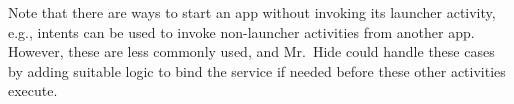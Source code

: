 \documentclass[preprint]{sig-alternate-10pt}
\newcommand{\code}[1]{\textsf{#1}}
\newcommand{\lib}{Mr.\ Hide\xspace}
\newcommand{\comment}[3][\color{red}]{}%
\newcommand{\jeff}[1]{\comment[\color{green}]{JSF}{#1}}
\newcommand{\jsjeon}[1]{\comment[\color{red}]{JJ}{#1}}
\newcommand{\kris}[1]{\comment[\color{orange}]{KM}{#1}}
\begin{document}
Note that there are ways to start an app without invoking its launcher
activity, e.g., intents can be used to invoke non-launcher activities
from another app. However, these are less commonly used, and \lib
could handle these cases by adding suitable logic to bind the service
if needed before these other activities execute.


\end{document}
